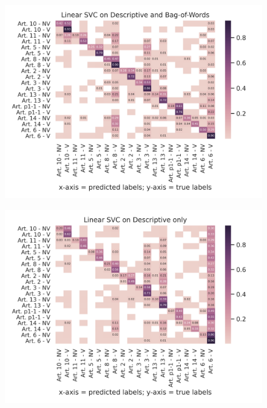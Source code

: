 \documentclass{article}
\begin{document}
\begin{figure}[!htb]
    \centering
    \includegraphics[scale=0.7]{data/analysis/cm/multiclass_cm_test_linear_svc_descriptive_and_bag-of-words.png}  
\end{figure}
\begin{figure}[!htb]
    \centering
    \includegraphics[scale=0.7]{data/analysis/cm/multiclass_cm_test_linear_svc_descriptive_only.png}  
\end{figure}
\end{document}
